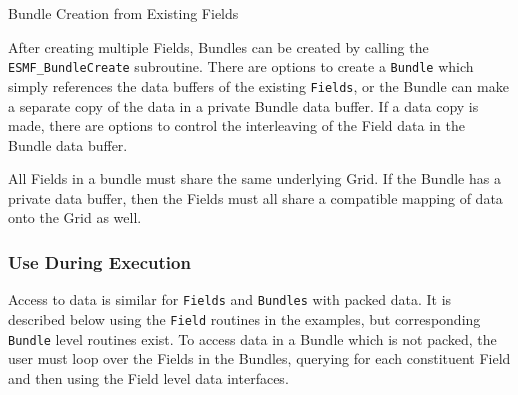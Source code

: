 \begin{description}

\item{Bundle Creation from Existing Fields}

After creating multiple Fields, Bundles can be created
by calling the {\tt ESMF\_BundleCreate} subroutine.  There are
options to create a {\tt Bundle} which simply references
the data buffers of the existing {\tt Fields}, 
or the Bundle can make a separate copy of the data in a private 
Bundle data buffer.  If a data copy is made, there are options to
control the interleaving of the Field data in the Bundle data buffer.

All Fields in a bundle must share the same underlying Grid.
If the Bundle has a private data buffer, then the Fields must
all share a compatible mapping of data onto the Grid as well.

\end{description}

\subsubsection{Use During Execution}

Access to data is similar for {\tt Fields} and {\tt Bundles} with
packed data.  It is described below using the {\tt Field}
routines in the examples, but corresponding {\tt Bundle} level
routines exist.  To access data in a
Bundle which is not packed, the user must loop over the
Fields in the Bundles, querying for each
constituent Field and then using the Field level data interfaces.

